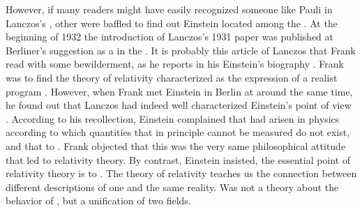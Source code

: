 \documentclass[draft]{article}
\begin{document}



However, if many readers might have easily recognized someone like Pauli in Lanczos's , other were baffled to find out Einstein located among the . At the beginning of 1932 the introduction of Lanczos's 1931 paper was published at Berliner's suggestion as a  in the   \citep[113]{Lanczos1932}. It is probably this article of Lanczos that Frank read with some bewilderment, as he reports in his Einstein's biography \citep{Frank1947}. Frank was  to find the theory of relativity characterized as the expression of a realist program  \citep[215]{Frank1947}. However, when Frank met Einstein in Berlin at around the same time, he found out that Lanczos had indeed well characterized Einstein's point of view \citep[215f.]{Frank1947}. According to his recollection, Einstein complained that  had arisen in physics according to which quantities that in principle cannot be measured do not exist, and that to  \citep[216]{Frank1947}. Frank objected that this was the very same philosophical attitude that led to relativity theory. By contrast, Einstein insisted, the essential point of relativity theory is to   \citep[216]{Frank1947}. The theory of relativity teaches us the connection between different descriptions of one and the same reality. Was not a theory about the behavior of \rac, but a unification of two fields.



%
\end{document}
